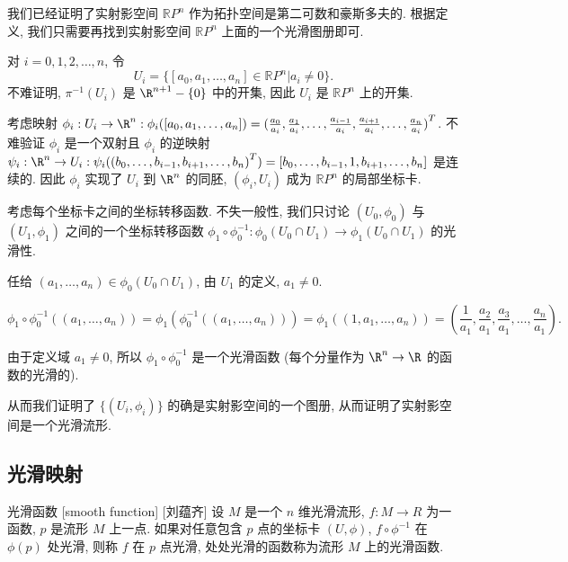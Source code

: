 \documentclass[UTF8]{ctexart}
\begin{document}
        \begin{prf}
            我们已经证明了实射影空间 \(\mathbb{R}P^n\) 作为拓扑空间是第二可数和豪斯多夫的. 根据定义, 我们只需要再找到实射影空间 \(\mathbb{R}P^n\) 上面的一个光滑图册即可. 

            对 \(i = 0,1,2,\dots,n\), 令
            \[
                U_i = \{[a_0, a_1, \dots, a_n] \in \mathbb{R}P^n | a_i \neq 0\}.
            \]
            不难证明,  \(\pi^{-1}(U_i)\)  是 \(\R^{n+1}-\{0\}\) 中的开集, 因此 \(U_i\) 是 \(\mathbb{R}P^n\) 上的开集. 

            考虑映射 \(\phi_i: U_i \rightarrow \R^n: \phi_i([a_0, a_1, \dots, a_n]) = {(\frac{a_0}{a_i},\frac{a_1}{a_i}, \dots, \frac{a_{i-1}}{a_i},\frac{a_{i+1}}{a_i},\dots, \frac{a_{n}}{a_i})}^{T}\). 不难验证 \(\phi_i\) 是一个双射且 \(\phi_i\) 的逆映射 \(\psi_i: \R^n \rightarrow U_i: \psi_i({(b_0, \dots,b_{i-1},b_{i+1},\dots, b_n)}^T) = [b_0, \dots,b_{i-1},1,b_{i+1},\dots, b_n]\) 是连续的. 因此 \(\phi_i\) 实现了 \(U_i\) 到 \(\R^n\) 的同胚, \((\phi_i,U_i)\) 成为 \(\mathbb{R}P^n\) 的局部坐标卡.  

            考虑每个坐标卡之间的坐标转移函数.  不失一般性, 我们只讨论 \((U_0, \phi_0)\) 与 \((U_1, \phi_1)\) 之间的一个坐标转移函数 \(\phi_1 \circ \phi_0^{-1}: \phi_0(U_0 \cap U_1) \rightarrow \phi_1(U_0 \cap U_1)\) 的光滑性. 

            任给 \((a_1,\dots,a_n) \in \phi_0(U_0 \cap U_1)\), 由 \(U_1\) 的定义,  \(a_1 \neq 0\). 

            \[
                \phi_1 \circ \phi_0^{-1}((a_1,\dots,a_n)) = \phi_1(\phi_0^{-1}((a_1,\dots,a_n))) = \phi_1((1, a_1,\dots,a_n))
                = (\frac{1}{a_1}, \frac{a_2}{a_1},\frac{a_3}{a_1}, \dots, \frac{a_n}{a_1}).
            \]

            由于定义域 \(a_1 \neq 0\), 所以 \(\phi_1 \circ \phi_0^{-1}\) 是一个光滑函数 (每个分量作为 \(\R^n \rightarrow \R\) 的函数的光滑的). 

            从而我们证明了 \(\{(U_i,\phi_i)\}\) 的确是实射影空间的一个图册, 从而证明了实射影空间是一个光滑流形. 
        \end{prf}
    
    \subsection{光滑映射}
    
        \begin{dfn}
            []
            {光滑函数}
            [smooth function]
            [刘蕴齐]
            设 \(M\) 是一个 \(n\) 维光滑流形,  \(f: M \rightarrow R \)  为一函数, \(p\) 是流形 \(M\) 上一点. 
            如果对任意包含 \(p\) 点的坐标卡 \((U,\phi)\),
             \(f \circ \phi^{-1}\) 在 \(\phi(p)\) 处光滑, 
            则称 \(f\) 在 \(p\) 点光滑,
            处处光滑的函数称为流形 \(M\) 上的光滑函数. 
        \end{dfn}
\end{document}
